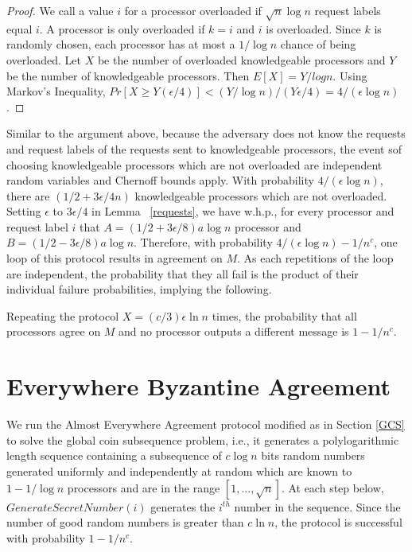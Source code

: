\documentclass{sig-alternate}
\begin{document}
\begin{proof} 
We call a value $i$ for a processor overloaded if $\sqrt{n} \log n$ request labels equal $i$.
A processor is only overloaded if $k=i$ and $i$ is overloaded.  Since $k$ is randomly chosen, each processor has 
at most a $1/\log n$ chance of being overloaded.  Let $X$ be the number of overloaded knowledgeable processors and
$Y$ be the number of knowledgeable processors.
Then $E[X]= Y/log n$. Using Markov's Inequality, $Pr[X \geq Y(\epsilon/4)] < (Y/\log n)/( Y \epsilon/4)=4/(\epsilon \log n)$. 
\end{proof}
Similar to the argument above, because the adversary does not know the requests and request labels of the requests 
sent to knowledgeable processors, the event sof choosing knowledgeable  processors which are not overloaded are independent random variables and Chernoff bounds apply. With probability $4/(\epsilon \log n)$, there are $(1/2 + 3\epsilon/4 n)$ knowledgeable processors which are not overloaded.
Setting $\epsilon$ to $3\epsilon/4$ in Lemma~ \ref{requests},  we  have w.h.p., for every processor and request label $i$ that $A=(1/2+ 3\epsilon/8) a \log n$ processor
and $B=(1/2 - 3\epsilon/8)a \log n$.  Therefore, with probability $4 / (\epsilon \log  n) -1/n^c$, one loop of this protocol results in agreement on $M$.   As each repetitions of the loop are independent, the probability that they all fail is the product of their individual failure
probabilities, implying the following.
 
\begin{lemma}
Repeating the protocol $X=(c/3) \epsilon  \ln n $ times,  the probability that all processors agree on $M$ and no processor outputs a different message is $1-1/n^c$. 

\end{lemma}



\section{Everywhere Byzantine Agreement}
We run the Almost Everywhere Agreement  protocol modified as in Section \ref{GCS}  to solve the global coin subsequence problem, i.e., it generates a polylogarithmic length sequence containing a subsequence of  $c\log n$ bits  random numbers  generated uniformly and independently at random which are
known to $1-1/\log n$ processors and are in the range $[1,...,\sqrt n]$.
At each step below, $GenerateSecretNumber(i)$ generates the $i^{th}$ number in the sequence.  Since the number of  good
random numbers is greater than $ c  \ln n $, the protocol is successful with probability $1-1/n^c$. 
\end{document}
